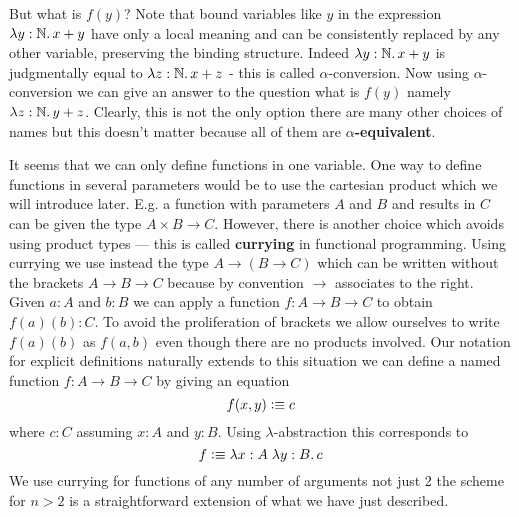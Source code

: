 But what is $f(y)$? Note that bound
variables like $y$ in the expression $\lam{y:\nat} x + y$
have only a local meaning and can be consistently replaced by any
other variable, preserving the binding structure. Indeed $\lam{y:\nat} x + y$ is judgmentally equal to
$\lam{z:\nat} x + z$ - this is called $\alpha$-conversion. Now
using $\alpha$-conversion we can give an answer to the question 
what is $f(y)$ namely  $\lam{z:\nat} y + z$. Clearly, this is not
the only option there are many other choices of names but this doesn't
matter because all of them are \textbf{$\alpha$-equivalent}.

It seems that we can only define functions in one variable. One
way to define functions in several parameters would be to use the
cartesian product which we will introduce later. E.g. a function with
parameters $A$ and $B$ and results in $C$ can be given the type 
$A \times B \to C$. However, there is another choice which avoids
using product types --- this is called \textbf{currying} in functional
programming. Using currying we use instead the type $A \to (B \to C)$
which can be written without the brackets $A \to B \to C$ because
by convention $\to$ associates to the right. Given $a : A$ and $b : B$
we can apply a function $f : A \to B \to C$ to obtain $f(a)(b) :
C$. To avoid the proliferation of brackets we allow ourselves to
write $f(a)(b)$ as $f(a,b)$ even though there are no products
involved. Our notation for explicit definitions naturally extends to
this situation we can define a named function $f : A \to B \to C$ by
giving an equation
\[ f(x,y) \vcentcolon\equiv c\]
where $c:C$ assuming $x:A$ and $y:B$. Using $\lambda$-abstraction this
corresponds to
\[ f \defeq \lam{x:A}{y:B} c \] We use currying for functions of any number of arguments not just 2 the scheme for $n>2$ is a straightforward extension of what we have just described.
 


